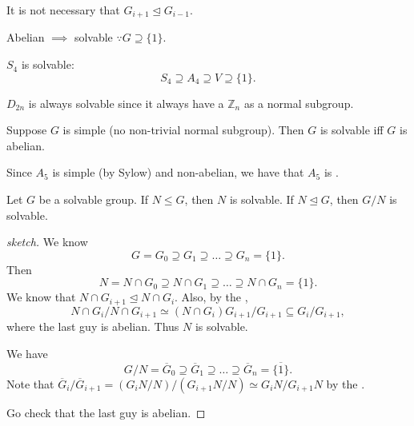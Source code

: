 \documentclass[notoc,notitlepage,nobib]{tufte-book}
\begin{document}
\begin{note}
  It is not necessary that $G_{i + 1} \trianglelefteq G_{i-1}$.
\end{note}

\begin{eg}
  Abelian $\implies$ solvable $\because G \supseteq \{1\}$.
\end{eg}

\begin{eg}
  $S_4$ is solvable:
  \begin{equation*}
    S_4 \supseteq A_4 \supseteq V \supseteq \{1\}.
  \end{equation*}
\end{eg}

\begin{eg}
  $D_{2n}$ is always solvable since it always have a $\mathbb{Z}_n$ as a normal
  subgroup.
\end{eg}

\begin{eg}
  Suppose $G$ is simple (no non-trivial normal subgroup). Then $G$ is solvable
  iff $G$ is abelian.
\end{eg}

\begin{eg}
  Since $A_5$ is simple (by Sylow) and non-abelian, we have that $A_5$ is
  .
\end{eg}

\begin{propo}\label{propo:subgroups_of_solvable_groups_are_solvable}
  Let $G$ be a solvable group. If $N \leq G$, then $N$ is solvable. If $N
  \trianglelefteq G$, then $G / N$ is solvable.
\end{propo}

\begin{proof}[sketch]
  We know
  \begin{equation*}
    G = G_0 \supseteq G_1 \supseteq \hdots \supseteq G_n =\{1\}.
  \end{equation*}
  Then
  \begin{equation*}
    N = N \cap G_0 \supseteq N \cap G_1 \supseteq \hdots \supseteq N \cap G_n =
    \{ 1 \}.
  \end{equation*}
  We know that $N \cap G_{i+1} \trianglelefteq N \cap G_i$. Also, by the
   ,
  \begin{equation*}
    N \cap G_i / N \cap G_{i+1} \simeq (N \cap G_i) G_{i+1} / G_{i+1} \subseteq
    G_i / G_{i+1},
  \end{equation*}
  where the last guy is abelian. Thus $N$ is solvable.

  We have
  \begin{equation*}
    G / N = \overline{G}_0 \supseteq \overline{G}_1 \supseteq \hdots
    \supseteq \overline{G}_n = \overline{\{1\}}.
  \end{equation*}
  Note that $\overline{G}_i / \overline{G}_{i+1} = \left( G_i N / N \right) /
  \left( G_{i+1} N / N \right) \simeq G_i N / G_{i+1} N$ by the .

  Go check that the last guy is abelian.
\end{proof}
\end{document}
